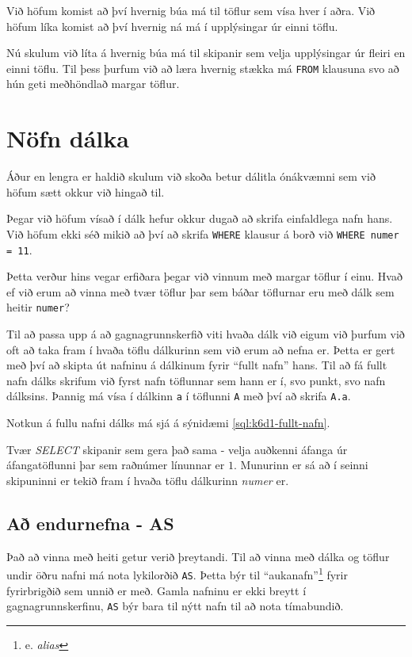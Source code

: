 Við höfum komist að því hvernig búa má til töflur sem vísa hver í aðra. Við höfum líka komist að því hvernig ná má í upplýsingar úr einni töflu.

Nú skulum við líta á hvernig búa má til skipanir sem velja upplýsingar úr fleiri en einni töflu. Til þess þurfum við að læra hvernig stækka má \verb|FROM| klausuna svo að hún geti meðhöndlað margar töflur.
\section{Nöfn dálka}
Áður en lengra er haldið skulum við skoða betur dálitla ónákvæmni sem við höfum sætt okkur við hingað til.

Þegar við höfum vísað í dálk hefur okkur dugað að skrifa einfaldlega nafn hans. Við höfum ekki séð mikið að því að skrifa \verb|WHERE| klausur á borð við \verb|WHERE numer = 11|.

Þetta verður hins vegar erfiðara þegar við vinnum með margar töflur í einu. Hvað ef við erum að vinna með tvær töflur þar sem báðar töflurnar eru með dálk sem heitir \verb|numer|?

Til að passa upp á að gagnagrunnskerfið viti hvaða dálk við eigum við þurfum við oft að taka fram í hvaða töflu dálkurinn sem við erum að nefna er. Þetta er gert með því að skipta út nafninu á dálkinum fyrir ``fullt nafn'' hans. Til að fá fullt nafn dálks skrifum við fyrst nafn töflunnar sem hann er í, svo punkt, svo nafn dálksins. Þannig má vísa í dálkinn \verb|a| í töflunni \verb|A| með því að skrifa \verb|A.a|.

Notkun á fullu nafni dálks má sjá á sýnidæmi \ref{sql:k6d1-fullt-nafn}.

\begin{example}
\caption[Fullt nafn dálks]{Tvær \emph{SELECT} skipanir sem gera það sama - velja auðkenni áfanga úr áfangatöflunni þar sem raðnúmer línunnar er $1$. Munurinn er sá að í seinni skipuninni er tekið fram í hvaða töflu dálkurinn \emph{numer} er.}
\label{sql:k6d1-fullt-nafn}
\centering
{}
\end{example}

\subsection{Að endurnefna - AS}
Það að vinna með heiti getur verið þreytandi. Til að vinna með dálka og töflur undir öðru nafni má nota lykilorðið \verb|AS|. Þetta býr til ``aukanafn''\footnote{e. \emph{alias}} fyrir fyrirbrigðið sem unnið er með. Gamla nafninu er ekki breytt í gagnagrunnskerfinu, \verb|AS| býr bara til nýtt nafn til að nota tímabundið.

